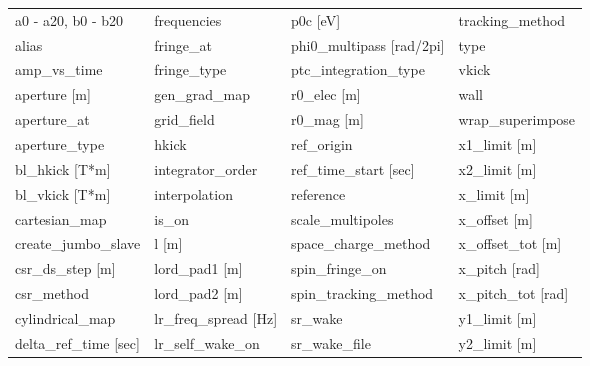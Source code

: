  \begin{tabular}{llll} \toprule
a0 - a20, b0 - b20               & frequencies                      & p0c [eV]                         & tracking_method                  \\
alias                            & fringe_at                        & phi0_multipass [rad/2pi]         & type                             \\
amp_vs_time                      & fringe_type                      & ptc_integration_type             & vkick                            \\
aperture [m]                     & gen_grad_map                     & r0_elec [m]                      & wall                             \\
aperture_at                      & grid_field                       & r0_mag [m]                       & wrap_superimpose                 \\
aperture_type                    & hkick                            & ref_origin                       & x1_limit [m]                     \\
bl_hkick [T*m]                   & integrator_order                 & ref_time_start [sec]             & x2_limit [m]                     \\
bl_vkick [T*m]                   & interpolation                    & reference                        & x_limit [m]                      \\
cartesian_map                    & is_on                            & scale_multipoles                 & x_offset [m]                     \\
create_jumbo_slave               & l [m]                            & space_charge_method              & x_offset_tot [m]                 \\
csr_ds_step [m]                  & lord_pad1 [m]                    & spin_fringe_on                   & x_pitch [rad]                    \\
csr_method                       & lord_pad2 [m]                    & spin_tracking_method             & x_pitch_tot [rad]                \\
cylindrical_map                  & lr_freq_spread [Hz]              & sr_wake                          & y1_limit [m]                     \\
delta_ref_time [sec]             & lr_self_wake_on                  & sr_wake_file                     & y2_limit [m]                     \\

\end{tabular}
